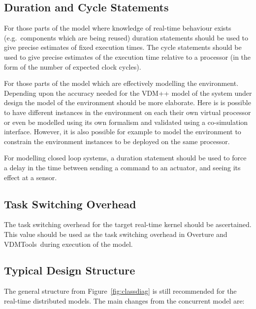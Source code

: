\documentclass{overturerepchap}
\newcommand{\vdmtools}{VDMTools}
\begin{document}
\subsection{Duration and Cycle Statements}

For those parts of the model where knowledge of real-time behaviour
exists (e.g.\ components which are being reused) duration statements
should be used to give precise estimates of fixed execution times. The 
cycle statements should be used to give precise estimates of the 
execution time relative to a processor (in the form of the number of 
expected clock cycles).

For those parts of the model which are effectively modelling the
environment. Depending upon the accuracy needed for the VDM++ model of
the system under design the model of the environment should be more
elaborate. Here is is possible to have different instances in the
environment on each their own virtual processor or even be modelled
using its own formalism and validated using a co-simulation
interface. 
However, it is also
possible for example to model the environment to constrain the
environment instances to be deployed on the same processor.

For modelling closed loop systems, a duration statement should be used
to force a delay in the time between sending a command to an actuator,
and seeing its effect at a sensor.

\subsection{Task Switching Overhead}

The task switching overhead for the target real-time kernel should be
ascertained. This value should be used as the task switching overhead
in Overture and \vdmtools\ during execution of the model.

\subsection{Typical Design Structure}\label{sec:designvice}

The general structure from Figure~\ref{fig:classdiag} is still recommended 
for the real-time distributed models. The main changes from the concurrent
model are:
\end{document}
